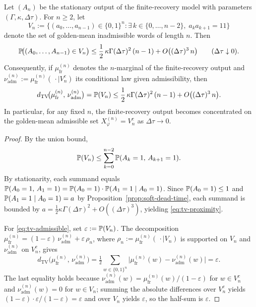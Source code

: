 \begin{proposition}\label{prop:tv-proximity}
Let $(A_n)$ be the stationary output of the finite-recovery model with parameters $(\Gamma,\kappa,\Delta\tau)$. For $n\ge 2$, let
\[
V_n:=\bigl\{(a_0,\dots,a_{n-1})\in\{0,1\}^n:\exists\,k\in\{0,\dots,n-2\},\;a_ka_{k+1}=11\bigr\}
\]
denote the set of golden-mean inadmissible words of length $n$. Then
\begin{equation}\label{eq:tv-proximity}
\mathbb{P}\!\bigl((A_0,\dots,A_{n-1})\in V_n\bigr)
\le
\frac12\,\kappa\Gamma(\Delta\tau)^2\,(n-1)
+
O\bigl((\Delta\tau)^3\,n\bigr)
\qquad(\Delta\tau\downarrow 0).
\end{equation}
Consequently, if $\mu_{\mathrm{fr}}^{(n)}$ denotes the $n$-marginal of the finite-recovery output and $\nu_{\mathrm{adm}}^{(n)}:=\mu_{\mathrm{fr}}^{(n)}(\,\cdot\mid V_n^c)$ its conditional law given admissibility, then
\begin{equation}\label{eq:tv-admissible}
d_{\mathrm{TV}}\!\bigl(\mu_{\mathrm{fr}}^{(n)},\,\nu_{\mathrm{adm}}^{(n)}\bigr)
=
\mathbb{P}(V_n)
\le
\frac12\,\kappa\Gamma(\Delta\tau)^2\,(n-1)
+
O\bigl((\Delta\tau)^3\,n\bigr).
\end{equation}
In particular, for any fixed $n$, the finite-recovery output becomes concentrated on the golden-mean admissible set $X_\varphi^{(n)}=V_n^c$ as $\Delta\tau\to 0$.
\end{proposition}

\begin{proof}
By the union bound,
\[
\mathbb{P}(V_n)
\le
\sum_{k=0}^{n-2}\mathbb{P}(A_k=1,\,A_{k+1}=1).
\]
By stationarity, each summand equals $\mathbb{P}(A_0=1,\,A_1=1)=\mathbb{P}(A_0=1)\cdot\mathbb{P}(A_1=1\mid A_0=1)$. Since $\mathbb{P}(A_0=1)\le 1$ and $\mathbb{P}(A_1=1\mid A_0=1)=a$ by Proposition~\ref{prop:soft-dead-time}, each summand is bounded by $a=\tfrac12\kappa\Gamma(\Delta\tau)^2+O((\Delta\tau)^3)$, yielding \eqref{eq:tv-proximity}.

For \eqref{eq:tv-admissible}, set $\varepsilon:=\mathbb{P}(V_n)$. The decomposition $\mu_{\mathrm{fr}}^{(n)}=(1-\varepsilon)\,\nu_{\mathrm{adm}}^{(n)}+\varepsilon\,\rho_n$, where $\rho_n:=\mu_{\mathrm{fr}}^{(n)}(\,\cdot\mid V_n)$ is supported on $V_n$ and $\nu_{\mathrm{adm}}^{(n)}$ on $V_n^c$, gives
\[
d_{\mathrm{TV}}\!\bigl(\mu_{\mathrm{fr}}^{(n)},\,\nu_{\mathrm{adm}}^{(n)}\bigr)
=
\tfrac12\sum_{w\in\{0,1\}^n}\bigl|\mu_{\mathrm{fr}}^{(n)}(w)-\nu_{\mathrm{adm}}^{(n)}(w)\bigr|
=
\varepsilon.
\]
The last equality holds because $\nu_{\mathrm{adm}}^{(n)}(w)=\mu_{\mathrm{fr}}^{(n)}(w)/(1-\varepsilon)$ for $w\in V_n^c$ and $\nu_{\mathrm{adm}}^{(n)}(w)=0$ for $w\in V_n$; summing the absolute differences over $V_n^c$ yields $(1-\varepsilon)\cdot\varepsilon/(1-\varepsilon)=\varepsilon$ and over $V_n$ yields $\varepsilon$, so the half-sum is $\varepsilon$.
\end{proof}

